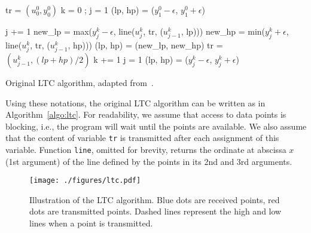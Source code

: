 \begin{algorithm}
\begin{algorithmic}[1]
\Input
\EndInput
\Output
\EndOutput
\State tr = $(u^0_0, y^0_0)$ 
\State k = 0 ; j = 1
\State (lp, hp) = ($y^0_1 - \epsilon$, $y^0_1 + \epsilon$) 

 
    \State j += 1
    \State new\_lp = max($y^k_j-\epsilon$, line($u^k_j$, tr, ($u^k_{j-1}$, lp)))
    \State new\_hp = min($y^k_j+\epsilon$, line($u^k_j$, tr, ($u^k_{j-1}$, hp)))
     
        \State (lp, hp) = (new\_lp, new\_hp)
    \Else
        \State tr = $(u^k_{j-1}, (lp+hp)/2)$
        \State k += 1
        \State j = 1
        \State (lp, hp) = ($y^k_j-\epsilon$, $y^k_j+\epsilon$)
    \EndIf
\EndWhile
\end{algorithmic}
\caption{Original LTC algorithm, adapted from~\cite{schoellhammer2004lightweight}.}
\label{algo:ltc}
\end{algorithm}

Using these notations, the original LTC algorithm can
be written as in Algorithm~\ref{algo:ltc}. For readability, we assume
that access to data points is blocking, i.e., the program will wait
until the points are available. We also assume that the content of
variable \texttt{tr} is transmitted after each assignment of this
variable. Function \texttt{line}, omitted for brevity, returns the
ordinate at abscissa $x$ (1st argument) of the line defined by the points
in its 2nd and 3rd arguments.

\begin{figure}[b]
\centering
\texttt{[image: ./figures/ltc.pdf]}
\caption{Illustration of the LTC algorithm. Blue 
dots are received points, red dots are transmitted points. Dashed lines 
represent the high and low lines when a point is 
transmitted.\vspace*{-0.3cm}}
\label{fig:ltc}
\end{figure}

